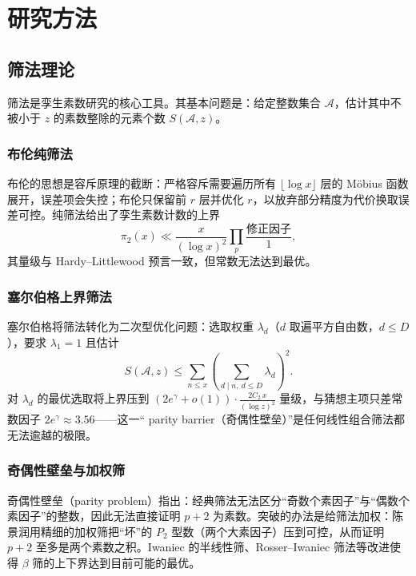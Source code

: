 \section{研究方法}\label{sec:methods}

\subsection{筛法理论}

筛法是孪生素数研究的核心工具。其基本问题是：给定整数集合 $\mathcal{A}$，估计其中不被小于 $z$ 的素数整除的元素个数 $S(\mathcal{A}, z)$。

\subsubsection{布伦纯筛法}

布伦的思想是容斥原理的截断：严格容斥需要遍历所有 $\lfloor \log x \rfloor$ 层的 M\"obius 函数展开，误差项会失控；布伦只保留前 $r$ 层并优化 $r$，以放弃部分精度为代价换取误差可控\cite{brun1919}。纯筛法给出了孪生素数计数的上界
\begin{equation}
    \pi_2(x) \ll \frac{x}{(\log x)^2} \prod_{p} \frac{\text{修正因子}}{1},
\end{equation}
其量级与 Hardy--Littlewood 预言一致，但常数无法达到最优。

\subsubsection{塞尔伯格上界筛法}

塞尔伯格将筛法转化为二次型优化问题：选取权重 $\lambda_d$（$d$ 取遍平方自由数，$d \le D$），要求 $\lambda_1 = 1$ 且估计
\begin{equation}
    S(\mathcal{A}, z) \le \sum_{n \le x} \left(\sum_{d \mid n,\ d \le D} \lambda_d\right)^2.
\end{equation}
对 $\lambda_d$ 的最优选取将上界压到 $\left(2 e^{\gamma} + o(1)\right) \cdot \frac{2C_2\, x}{(\log z)^2}$ 量级，与猜想主项只差常数因子 $2e^{\gamma} \approx 3.56$——这一“ parity barrier（奇偶性壁垒）”是任何线性组合筛法都无法逾越的极限\cite{halberstam1974sieve,iwaniec2004opera}。

\subsubsection{奇偶性壁垒与加权筛}

奇偶性壁垒（parity problem）指出：经典筛法无法区分“奇数个素因子”与“偶数个素因子”的整数，因此无法直接证明 $p+2$ 为素数。突破的办法是给筛法加权：陈景润用精细的加权筛把“坏”的 $P_2$ 型数（两个大素因子）压到可控，从而证明 $p+2$ 至多是两个素数之积\cite{chen1973twin}。Iwaniec 的半线性筛、Rosser--Iwaniec 筛法等改进使得 $\beta$ 筛的上下界达到目前可能的最优。

